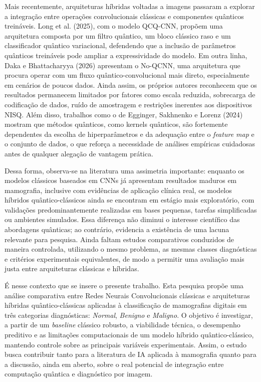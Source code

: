 \documentclass[
    12pt,
    openright,
    oneside,
    a4paper,
    english,
    brazil
]{abntex2}
\begin{document}
Mais recentemente, arquiteturas híbridas voltadas a imagens passaram a explorar a integração entre operações convolucionais clássicas e componentes quânticos treináveis. Long et al. (2025), com o modelo QCQ-CNN, propõem uma arquitetura composta por um filtro quântico, um bloco clássico raso e um classificador quântico variacional, defendendo que a inclusão de parâmetros quânticos treináveis pode ampliar a expressividade do modelo. Em outra linha, Daka e Bhattacharyya (2026) apresentam o No-QCNN, uma arquitetura que procura operar com um fluxo quântico-convolucional mais direto, especialmente em cenários de poucos dados. Ainda assim, os próprios autores reconhecem que os resultados permanecem limitados por fatores como escala reduzida, sobrecarga de codificação de dados, ruído de amostragem e restrições inerentes aos dispositivos NISQ. Além disso, trabalhos como o de Egginger, Sakhnenko e Lorenz (2024) mostram que métodos quânticos, como kernels quânticos, são fortemente dependentes da escolha de hiperparâmetros e da adequação entre o \textit{feature map} e o conjunto de dados, o que reforça a necessidade de análises empíricas cuidadosas antes de qualquer alegação de vantagem prática.

Dessa forma, observa-se na literatura uma assimetria importante: enquanto os modelos clássicos baseados em CNNs já apresentam resultados maduros em mamografia, inclusive com evidências de aplicação clínica real, os modelos híbridos quântico-clássicos ainda se encontram em estágio mais exploratório, com validações predominantemente realizadas em bases pequenas, tarefas simplificadas ou ambientes simulados. Essa diferença não diminui o interesse científico das abordagens quânticas; ao contrário, evidencia a existência de uma lacuna relevante para pesquisa. Ainda faltam estudos comparativos conduzidos de maneira controlada, utilizando o mesmo problema, as mesmas classes diagnósticas e critérios experimentais equivalentes, de modo a permitir uma avaliação mais justa entre arquiteturas clássicas e híbridas.

É nesse contexto que se insere o presente trabalho. Esta pesquisa propõe uma análise comparativa entre Redes Neurais Convolucionais clássicas e arquiteturas híbridas quântico-clássicas aplicadas à classificação de mamografias digitais em três categorias diagnósticas: \textit{Normal}, \textit{Benigno} e \textit{Maligno}. O objetivo é investigar, a partir de um \textit{baseline} clássico robusto, a viabilidade técnica, o desempenho preditivo e as limitações computacionais de um modelo híbrido quântico-clássico, mantendo controle sobre as principais variáveis experimentais. Assim, o estudo busca contribuir tanto para a literatura de IA aplicada à mamografia quanto para a discussão, ainda em aberto, sobre o real potencial de integração entre computação quântica e diagnóstico por imagem.
\end{document}
